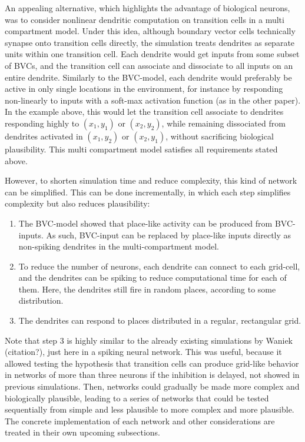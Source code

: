 \documentclass{article}
\begin{document}
    An appealing alternative, which highlights the advantage of biological neurons, was to consider nonlinear dendritic computation on transition cells in a multi compartment model. Under this idea, although boundary vector cells technically synapse onto transition cells directly, the simulation treats dendrites as separate units within one transition cell. Each dendrite would get inputs from some subset of BVCs, and the transition cell can associate and dissociate to all inputs on an entire dendrite. Similarly to the BVC-model, each dendrite would preferably be active in only single locations in the environment, for instance by responding non-linearly to inputs with a soft-max activation function (as in the other paper). In the example above, this would let the transition cell associate to dendrites responding highly to \((x_1, y_1)\) or \((x_2, y_2)\), while remaining dissociated from dendrites activated in \((x_1, y_2)\) or \((x_2, y_1)\), without sacrificing biological plausibility. This multi compartment model satisfies all requirements stated above. 

    However, to shorten simulation time and reduce complexity, this kind of network can be simplified. This can be done incrementally, in which each step simplifies complexity but also reduces plausibility:
    \begin{enumerate}
        \item The BVC-model showed that place-like activity can be produced from BVC-inputs. As such, BVC-input can be replaced by place-like inputs directly as non-spiking dendrites in the multi-compartment model. 
        \item To reduce the number of neurons, each dendrite can connect to each grid-cell, and the dendrites can be spiking to reduce computational time for each of them. Here, the dendrites still fire in random places, according to some distribution.
        \item The dendrites can respond to places distributed in a regular, rectangular grid.
    \end{enumerate}
 
    Note that step 3 is highly similar to the already existing simulations by Waniek (citation?), just here in a spiking neural network. This was useful, because it allowed testing the hypothesis that transition cells can produce grid-like behavior in networks of more than three neurons if the inhibition is delayed, not showed in previous simulations. Then, networks could gradually be made more complex and biologically plausible, leading to a series of networks that could be tested sequentially from simple and less plausible to more complex and more plausible. The concrete implementation of each network and other considerations are treated in their own upcoming subsections.
\end{document}
